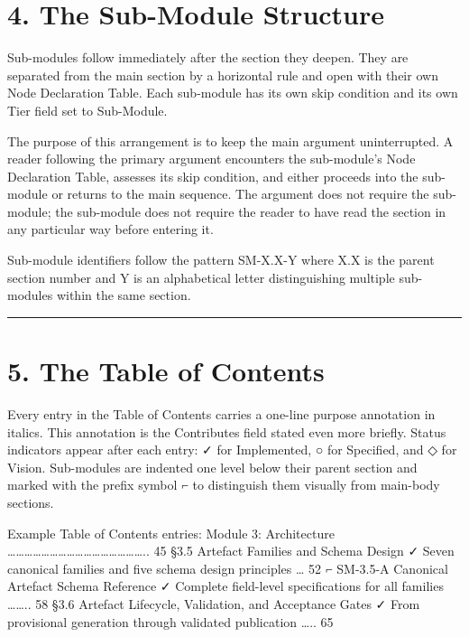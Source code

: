 \documentclass[
  11pt,
  a4paper,
  twoside,
  openright]{scrbook}
\begin{document}
\section{4. The Sub-Module Structure}\label{the-sub-module-structure}

Sub-modules follow immediately after the section they deepen. They are
separated from the main section by a horizontal rule and open with their
own Node Declaration Table. Each sub-module has its own skip condition
and its own Tier field set to Sub-Module.

The purpose of this arrangement is to keep the main argument
uninterrupted. A reader following the primary argument encounters the
sub-module's Node Declaration Table, assesses its skip condition, and
either proceeds into the sub-module or returns to the main sequence. The
argument does not require the sub-module; the sub-module does not
require the reader to have read the section in any particular way before
entering it.

Sub-module identifiers follow the pattern SM-X.X-Y where X.X is the
parent section number and Y is an alphabetical letter distinguishing
multiple sub-modules within the same section.

\begin{center}\rule{0.5\linewidth}{0.5pt}\end{center}

\section{5. The Table of Contents}\label{the-table-of-contents}

Every entry in the Table of Contents carries a one-line purpose
annotation in italics. This annotation is the Contributes field stated
even more briefly. Status indicators appear after each entry: ✓ for
Implemented, ○ for Specified, and ◇ for Vision. Sub-modules are indented
one level below their parent section and marked with the prefix symbol ⌐
to distinguish them visually from main-body sections.

Example Table of Contents entries: Module 3: Architecture
\ldots\ldots\ldots\ldots\ldots\ldots\ldots\ldots\ldots\ldots\ldots\ldots\ldots\ldots\ldots\ldots..
45 §3.5 Artefact Families and Schema Design ✓ Seven canonical families
and five schema design principles \ldots{} 52 ⌐ SM-3.5-A Canonical
Artefact Schema Reference ✓ Complete field-level specifications for all
families \ldots\ldots.. 58 §3.6 Artefact Lifecycle, Validation, and
Acceptance Gates ✓ From provisional generation through validated
publication \ldots.. 65
\end{document}
